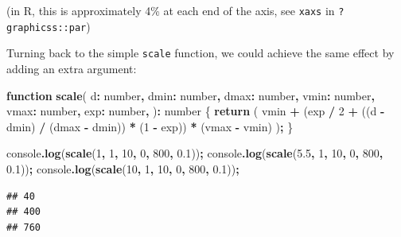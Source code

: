 \documentclass[
]{book}
\newenvironment{Shaded}{\begin{snugshade}}{\end{snugshade}}
\newcommand{\BuiltInTok}[1]{#1}
\newcommand{\ControlFlowTok}[1]{\textcolor[rgb]{0.13,0.29,0.53}{\textbf{#1}}}
\newcommand{\DataTypeTok}[1]{\textcolor[rgb]{0.13,0.29,0.53}{#1}}
\newcommand{\DecValTok}[1]{\textcolor[rgb]{0.00,0.00,0.81}{#1}}
\newcommand{\FloatTok}[1]{\textcolor[rgb]{0.00,0.00,0.81}{#1}}
\newcommand{\FunctionTok}[1]{\textcolor[rgb]{0.13,0.29,0.53}{\textbf{#1}}}
\newcommand{\KeywordTok}[1]{\textcolor[rgb]{0.13,0.29,0.53}{\textbf{#1}}}
\newcommand{\NormalTok}[1]{#1}
\newcommand{\OperatorTok}[1]{\textcolor[rgb]{0.81,0.36,0.00}{\textbf{#1}}}
\theoremstyle{definition}
\theoremstyle{definition}
\theoremstyle{definition}
\theoremstyle{definition}
\theoremstyle{remark}
\begin{document}
(in R, this is approximately 4\% at each end of the axis, see \texttt{xaxs} in \texttt{?graphicss::par})

Turning back to the simple \texttt{scale} function, we could achieve the same effect by adding an extra argument:

\begin{Shaded}
\begin{Highlighting}[]
\KeywordTok{function} \FunctionTok{scale}\NormalTok{(}
\NormalTok{  d}\OperatorTok{:} \DataTypeTok{number}\OperatorTok{,}
\NormalTok{  dmin}\OperatorTok{:} \DataTypeTok{number}\OperatorTok{,}
\NormalTok{  dmax}\OperatorTok{:} \DataTypeTok{number}\OperatorTok{,}
\NormalTok{  vmin}\OperatorTok{:} \DataTypeTok{number}\OperatorTok{,}
\NormalTok{  vmax}\OperatorTok{:} \DataTypeTok{number}\OperatorTok{,}
\NormalTok{  exp}\OperatorTok{:} \DataTypeTok{number}\OperatorTok{,}
\NormalTok{)}\OperatorTok{:} \DataTypeTok{number}\NormalTok{ \{}
  \ControlFlowTok{return}\NormalTok{ (}
\NormalTok{    vmin }\OperatorTok{+}\NormalTok{ (exp }\OperatorTok{/} \DecValTok{2} \OperatorTok{+}\NormalTok{ ((d }\OperatorTok{{-}}\NormalTok{ dmin) }\OperatorTok{/}\NormalTok{ (dmax }\OperatorTok{{-}}\NormalTok{ dmin)) }\OperatorTok{*}\NormalTok{ (}\DecValTok{1} \OperatorTok{{-}}\NormalTok{ exp)) }\OperatorTok{*}\NormalTok{ (vmax }\OperatorTok{{-}}\NormalTok{ vmin)}
\NormalTok{  )}\OperatorTok{;}
\NormalTok{\}}

\BuiltInTok{console}\OperatorTok{.}\FunctionTok{log}\NormalTok{(}\FunctionTok{scale}\NormalTok{(}\DecValTok{1}\OperatorTok{,} \DecValTok{1}\OperatorTok{,} \DecValTok{10}\OperatorTok{,} \DecValTok{0}\OperatorTok{,} \DecValTok{800}\OperatorTok{,} \FloatTok{0.1}\NormalTok{))}\OperatorTok{;}
\BuiltInTok{console}\OperatorTok{.}\FunctionTok{log}\NormalTok{(}\FunctionTok{scale}\NormalTok{(}\FloatTok{5.5}\OperatorTok{,} \DecValTok{1}\OperatorTok{,} \DecValTok{10}\OperatorTok{,} \DecValTok{0}\OperatorTok{,} \DecValTok{800}\OperatorTok{,} \FloatTok{0.1}\NormalTok{))}\OperatorTok{;}
\BuiltInTok{console}\OperatorTok{.}\FunctionTok{log}\NormalTok{(}\FunctionTok{scale}\NormalTok{(}\DecValTok{10}\OperatorTok{,} \DecValTok{1}\OperatorTok{,} \DecValTok{10}\OperatorTok{,} \DecValTok{0}\OperatorTok{,} \DecValTok{800}\OperatorTok{,} \FloatTok{0.1}\NormalTok{))}\OperatorTok{;}
\end{Highlighting}
\end{Shaded}

\begin{verbatim}
## 40
## 400
## 760
\end{verbatim}
\end{document}
